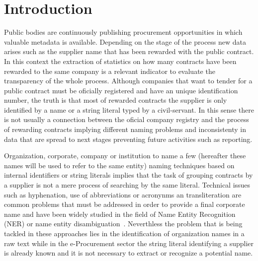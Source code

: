 \documentclass{llncs}
\begin{document}
\section{Introduction}
Public bodies are continuously publishing procurement opportunities in which 
valuable metadata is available. Depending on the stage of the process new data arises such 
as the supplier name that has been rewarded with the public contract. In this 
context the extraction of statistics on how many contracts have been 
rewarded to the same company is a relevant indicator to evaluate the transparency 
of the whole process. Although companies that want to tender for a public contract must be 
oficially registered and have an unique identification number, the truth is 
that most of rewarded contracts the supplier is only identified by a name or a string literal typed 
by a civil-servant. In this sense there is not usually a connection between 
the oficial company registry and the process of rewarding contracts implying different 
naming problems and inconsistenty in data that are spread to next stages preventing future 
activities such as reporting.

Organization, corporate, company or institution to name a few (hereafter these names will be used 
to refer to the same entity) naming techniques based on internal identifiers or string literals implies 
that the task of grouping contracts by a supplier is not a mere process of searching by the same literal. 
Technical issues such as hyphenation, use of abbreviations or acronynms an transliteration are 
common problems that must be addressed in order to provide a final corporate name and have been widely studied in the 
field of Name Entity Recognition~\cite{citeulike:1657521} (NER) or name entity disambiguation~\cite{Sarmento:2009:AWN:1602022.1602085,Klein:2003:NER:1119176.1119204}. 
Neverthless the problem that is being tackled in these approaches lies in the identification of organization 
names in a raw text while in the e-Procurement sector the string literal identifying a supplier is already 
known and it is not necessary to extract or recognize a potential name.
\end{document}
